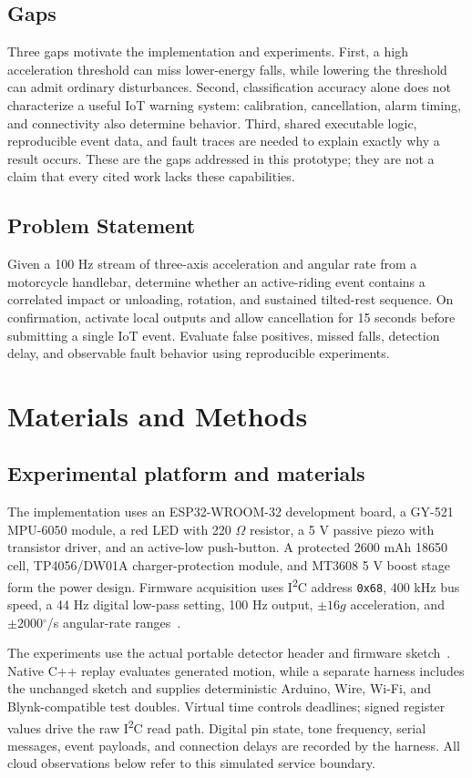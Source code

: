 \documentclass[10pt,a4paper]{article}
\newcommand{\degree}{\ensuremath{^{\circ}}}
\begin{document}
\subsection*{Gaps}
Three gaps motivate the implementation and experiments. First, a high acceleration threshold can miss lower-energy falls, while lowering the threshold can admit ordinary disturbances. Second, classification accuracy alone does not characterize a useful IoT warning system: calibration, cancellation, alarm timing, and connectivity also determine behavior. Third, shared executable logic, reproducible event data, and fault traces are needed to explain exactly why a result occurs. These are the gaps addressed in this prototype; they are not a claim that every cited work lacks these capabilities.

\subsection*{Problem Statement}
Given a 100 Hz stream of three-axis acceleration and angular rate from a motorcycle handlebar, determine whether an active-riding event contains a correlated impact or unloading, rotation, and sustained tilted-rest sequence. On confirmation, activate local outputs and allow cancellation for 15 seconds before submitting a single IoT event. Evaluate false positives, missed falls, detection delay, and observable fault behavior using reproducible experiments.

\section{Materials and Methods}
\subsection{Experimental platform and materials}
The implementation uses an ESP32-WROOM-32 development board, a GY-521 MPU-6050 module, a red LED with 220 $\Omega$ resistor, a 5 V passive piezo with transistor driver, and an active-low push-button. A protected 2600 mAh 18650 cell, TP4056/DW01A charger-protection module, and MT3608 5 V boost stage form the power design. Firmware acquisition uses I\textsuperscript{2}C address \texttt{0x68}, 400 kHz bus speed, a 44 Hz digital low-pass setting, 100 Hz output, $\pm16g$ acceleration, and $\pm2000\degree$/s angular-rate ranges~\cite{mpu6050datasheet}.

The experiments use the actual portable detector header and firmware sketch~\cite{localcode}. Native C++ replay evaluates generated motion, while a separate harness includes the unchanged sketch and supplies deterministic Arduino, Wire, Wi-Fi, and Blynk-compatible test doubles. Virtual time controls deadlines; signed register values drive the raw I\textsuperscript{2}C read path. Digital pin state, tone frequency, serial messages, event payloads, and connection delays are recorded by the harness. All cloud observations below refer to this simulated service boundary.
\end{document}
